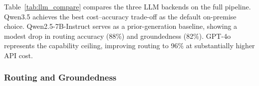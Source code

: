 \documentclass[10pt, a4paper, twocolumn]{article}
\begin{document}
Table~\ref{tab:llm_compare} compares the three LLM backends on the full pipeline.
Qwen3.5 achieves the best cost--accuracy trade-off as the default on-premise choice.
Qwen2.5-7B-Instruct serves as a prior-generation baseline, showing a modest drop in routing accuracy (88\%) and groundedness (82\%).
GPT-4o represents the capability ceiling, improving routing to 96\% at substantially higher API cost.

\begin{table}[h]
    \centering
    \caption{LLM backend comparison on the full pipeline (50 queries). Cost is estimated USD per query at standard API pricing.}
    \label{tab:llm_compare}
    \small
\end{table}

\subsubsection{Routing and Groundedness}

\begin{table}[t]
    \centering
    \caption{Intent routing accuracy and answer groundedness (\%) across evaluation categories.}
    \label{tab:accuracy}
    \small
\end{table}
\end{document}
